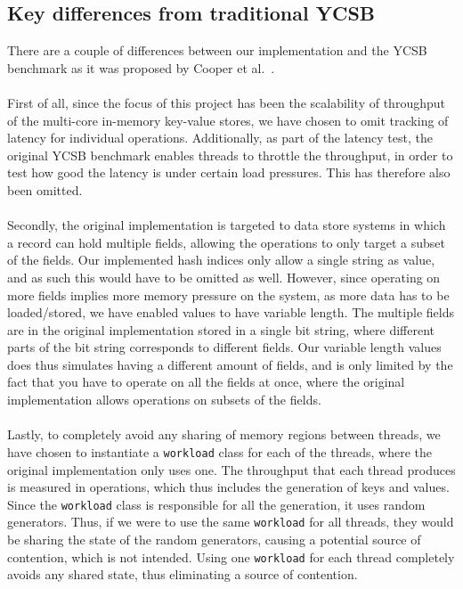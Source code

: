 \documentclass[11pt]{report} %
\begin{document}
\subsection{Key differences from traditional YCSB}
\label{subsec:key_diff_ycsb} 
There are a couple of differences between our implementation and the YCSB benchmark as it was proposed by Cooper et al.~\cite{BCycsb}. \\
\\
First of all, since the focus of this project has been the scalability of throughput of the multi-core in-memory key-value stores, we have chosen to omit tracking of latency for individual operations. Additionally, as part of the latency test, the original YCSB benchmark enables threads to throttle the throughput, in order to test how good the latency is under certain load pressures. This has therefore also been omitted. \\
\\
Secondly, the original implementation is targeted to data store systems in which a record can hold multiple fields, allowing the operations to only target a subset of the fields. Our implemented hash indices only allow a single string as value, and as such this would have to be omitted as well. However, since operating on more fields implies more memory pressure on the system, as more data has to be loaded/stored, we have enabled values to have variable length. The multiple fields are in the original implementation stored in a single bit string, where different parts of the bit string corresponds to different fields. Our variable length values does thus simulates having a different amount of fields, and is only limited by the fact that you have to operate on all the fields at once, where the original implementation allows operations on subsets of the fields.\\
\\
Lastly, to completely avoid any sharing of memory regions between threads, we have chosen to instantiate a \verb|workload| class for each of the threads, where the original implementation only uses one. The throughput that each thread produces is measured in operations, which thus includes the generation of keys and values. Since the \verb|workload| class is responsible for all the generation, it uses random generators. Thus, if we were to use the same \verb|workload| for all threads, they would be sharing the state of the random generators, causing a potential source of contention, which is not intended. Using one \verb|workload| for each thread completely avoids any shared state, thus eliminating a source of contention.
\end{document}

